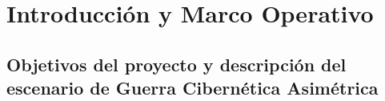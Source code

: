 \chapter[Introducción y Marco Operativo]{Introducción y Marco Operativo}
\label{chap:introduccion_y_marco_operativo}

\section[Objetivos y Escenario de Guerra Cibernética]{Objetivos del proyecto y descripción del escenario de Guerra Cibernética Asimétrica}
\label{sec:objetivos_proyecto}
